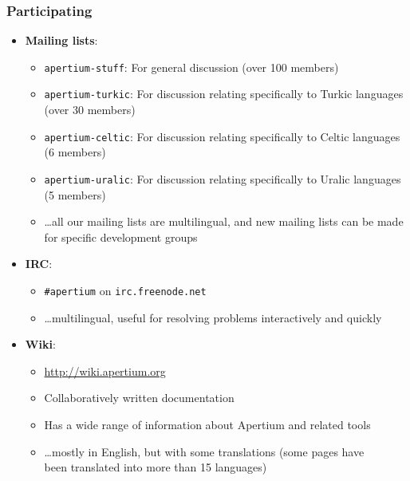 \documentclass[10pt,xetex]{beamer} %
\begin{document}
\begin{frame}
  \frametitle{Participating} %

\begin{itemize}
  \item {\bf Mailing lists}: %
  \begin{itemize}
    \item {\tt apertium-stuff}: For general discussion (over 100 members)
    \item {\tt apertium-turkic}: For discussion relating specifically to Turkic languages (over 30 members)
    \item {\tt apertium-celtic}: For discussion relating specifically to Celtic languages (6 members)
    \item {\tt apertium-uralic}: For discussion relating specifically to Uralic languages (5 members)
    \item \ldots all our mailing lists are multilingual, and new mailing lists can be made for specific development groups
  \end{itemize}
  \item {\bf IRC}: 
  \begin{itemize}
    \item {\tt \#apertium} on {\tt irc.freenode.net}
    \item \ldots multilingual, useful for resolving problems interactively and quickly
  \end{itemize}
  \item {\bf Wiki}:
  \begin{itemize}
    \item \url{http://wiki.apertium.org}
	    \item Collaboratively written documentation
    \item Has a wide range of information about Apertium and related tools
    \item \ldots mostly in English, but with some translations (some pages have \\been translated into more than 15 languages)
  \end{itemize}  
\end{itemize}


\end{frame}
\end{document}
